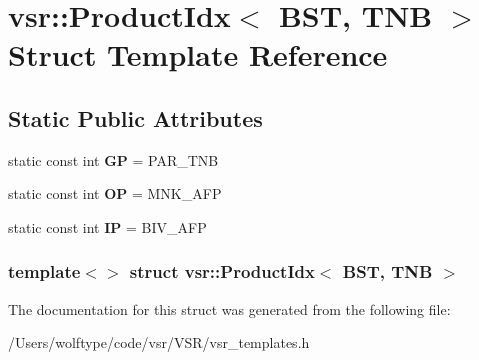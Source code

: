 \hypertarget{structvsr_1_1_product_idx_3_01_b_s_t_00_01_t_n_b_01_4}{\section{vsr\-:\-:Product\-Idx$<$ B\-S\-T, T\-N\-B $>$ Struct Template Reference}
\label{structvsr_1_1_product_idx_3_01_b_s_t_00_01_t_n_b_01_4}
}
\subsection*{Static Public Attributes}
\begin{DoxyCompactItemize}
\item 
\hypertarget{structvsr_1_1_product_idx_3_01_b_s_t_00_01_t_n_b_01_4_ae095a6383ddff540ddea2eb4825752cc}{static const int {\bfseries G\-P} = P\-A\-R\-\_\-\-T\-N\-B}\label{structvsr_1_1_product_idx_3_01_b_s_t_00_01_t_n_b_01_4_ae095a6383ddff540ddea2eb4825752cc}

\item 
\hypertarget{structvsr_1_1_product_idx_3_01_b_s_t_00_01_t_n_b_01_4_a92af1cbbdb0466914931e4f97ca3a5c2}{static const int {\bfseries O\-P} = M\-N\-K\-\_\-\-A\-F\-P}\label{structvsr_1_1_product_idx_3_01_b_s_t_00_01_t_n_b_01_4_a92af1cbbdb0466914931e4f97ca3a5c2}

\item 
\hypertarget{structvsr_1_1_product_idx_3_01_b_s_t_00_01_t_n_b_01_4_af06641a1eaf9e6c0fec836dd93e2dee3}{static const int {\bfseries I\-P} = B\-I\-V\-\_\-\-A\-F\-P}\label{structvsr_1_1_product_idx_3_01_b_s_t_00_01_t_n_b_01_4_af06641a1eaf9e6c0fec836dd93e2dee3}

\end{DoxyCompactItemize}
\subsubsection*{template$<$$>$ struct vsr\-::\-Product\-Idx$<$ B\-S\-T, T\-N\-B $>$}



The documentation for this struct was generated from the following file\-:\begin{DoxyCompactItemize}
\item 
/\-Users/wolftype/code/vsr/\-V\-S\-R/vsr\-\_\-templates.\-h\end{DoxyCompactItemize}
